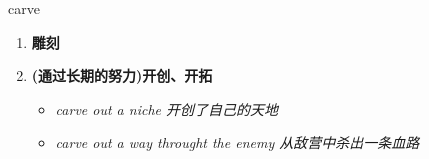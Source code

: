 
\begin{frame}
{\huge carve}
\begin{center}
\begin{enumerate}\Large
  \item \textbf{雕刻}
  \item \textbf{(通过长期的努力)开创、开拓}
  \begin{itemize}
    \item \em{\Large{carve out a niche 开创了自己的天地}}
    \item \em{\Large{carve out a way throught the enemy 从敌营中杀出一条血路}}
  \end{itemize}
\end{enumerate}
\end{center}
\end{frame}
